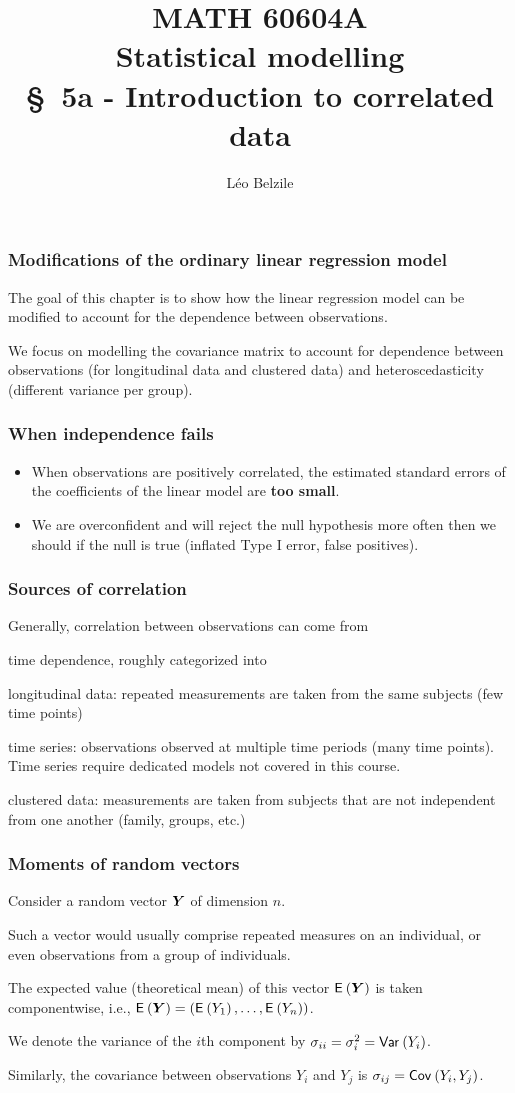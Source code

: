 \documentclass{beamer}
\title[\color{white}{MATH 60604A \S~5a - Introduction to correlated data}]{\texorpdfstring{MATH 60604A \\Statistical modelling \\ \S~5a - Introduction  to correlated data}{MATH 60604A \\Statistical modelling \\ \S~5a - Introduction  to correlated data}}
\author{Léo Belzile}
\institute{HEC Montréal\\
Department of Decision Sciences}
\date{}
\begin{document}
\frame{\titlepage}
\begin{frame}
\frametitle{Modifications of the ordinary linear regression model}
\bi \item The goal of this chapter is to show how the linear regression model can be modified to account for the dependence between observations.
\item 
We focus on modelling the covariance matrix to account for dependence between observations (for longitudinal data and clustered data) and heteroscedasticity (different variance per group).
\ei

\end{frame}
\begin{frame}
 \frametitle{When independence fails}
 \begin{itemize}
  \item When observations are positively correlated, the estimated standard errors of the coefficients of the linear model are \textbf{too small}.
  \item We are overconfident and will reject the null hypothesis more often then we should if the null is true (inflated Type I error, false positives).
  
  \end{itemize}
  \end{frame}
  \begin{frame}
  \frametitle{Sources of correlation}
  Generally, correlation between observations can come from 
\bi
\item  time dependence, roughly categorized into
\bi \item longitudinal data: repeated measurements are taken from the same subjects (few time points)
\item time series: observations observed at multiple time periods (many time points). Time series require dedicated models not covered in this course.
\ei 
\item  clustered data: measurements are taken from subjects that are not independent from one another (family, groups, etc.)
\ei
\end{frame}


\begin{frame}
\frametitle{Moments of random vectors}
\bi
\item Consider a \alert{random vector} $\boldsymbol {Y}$ of dimension $n$. 
\bi
\item Such a vector would usually comprise
repeated measures on an individual, or even observations from a group of individuals. 
\ei
\item The expected value (theoretical mean) of this vector ${\mathsf E}_{}\left(\boldsymbol {Y}\right)$ is taken componentwise, i.e., ${\mathsf E}_{}\left(\boldsymbol {Y}\right) = ({\mathsf E}_{}\left(Y_1\right), \ldots, {\mathsf E}_{}\left(Y_n\right))$.
\item We denote the variance of the $i$th component by $\sigma_{ii} = \sigma^2_i={\mathsf{Var}_{}}\left(Y_i\right)$.
\item Similarly, the covariance between observations $Y_i$ and $Y_j$ is  $\sigma_{ij}={\mathsf{Cov}_{}}\left(Y_i, Y_j\right)$.
\ei
\end{frame}
\end{document}
